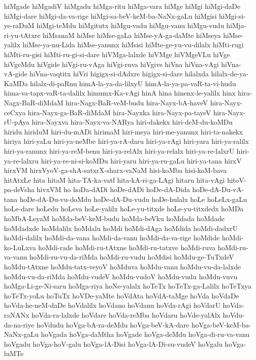 {hiMgade
hiMgadiV
hiMgadu
hiMga-ritu
hiMga-vara
hiMge
hiMgi
hiMgi-daDe
hiMgi-dare
hiMgi-da-va-rige
hiMgi-sa-beV-keM-ba-NaNx-gaLu
hiMgisi
hiMgi-si-ye-raDuM
hiMgi-teMdu
hiMgitutx
hiMgu-vadu
hiMgu-vanu
hiMgu-vudu
hiMja-ri-yu-tAtxre
hiMsanaM
hiMse
hiMse-gaLa
hiMse-yA-ga-daMte
hiMseya
hiMse-yalilx
hiMse-ya-nu-Lida
hiMse-yanunx
hiMsisi
hiMte-ge-yu-vu-dilalx
hiMti-rugi
hiMti-ru-gisi
hiMti-ru-gi-si-dare
hiVMga-lalxde
hiVMge
hiVMgeVLu
hiVge
hiVgeMdu
hiVgide
hiVgi-ru-vAga
hiVgi-ruva
hiVgive
hiVna
hiVna-vAgi
hiVna-vA-gide
hiVna-vaqtitx
hiVri
higigx-si-dAdxre
higigx-si-dare
hilalxda
hilalx-de-ya-KaMDa
hilalx-di-paRnu
himA-la-ya-da-lilxyU
himA-la-ya-pa-vaR-ta-vi-hudu
hima-va-tapx-vaR-ta-dalilx
himumx-Ka-vAgi
hinA
hina
hinenx-le-yalilx
hinx
hira-Nagx-BaR-diMdaM
hira-Nagx-BaR-veM-budu
hira-Nayx-bA-haveV
hira-Nayx-ceCxya
hira-Nayx-ga-BaR-diMdaM
hira-Nayxka
hira-Nayx-pa-tayeV
hira-Nayx-rU-pAya
hira-Nayxva
hira-Nayx-va-NARya
hiri-dakekx
hiri-deM-du-koMDu
hiridu
hiriduM
hiri-du-mADi
hirimaM
hiri-meya
hiri-me-yanunx
hiri-ta-nakekx
hiriya
hiri-yaLu
hiri-ya-neMbe
hiri-ya-rA-daru
hiri-ya-rAgi
hiri-yara
hiri-ya-ralilx
hiri-ya-ranunx
hiri-ya-reM-benu
hiri-ya-relAlx
hiri-ya-relalx
hiri-ya-re-lalxrU
hiri-ya-re-lalxru
hiri-ya-re-ni-si-koMDu
hiri-yaru
hiri-ya-ru-gaLu
hiri-ya-tana
hirxV
hirxVM
hirxVyoV-ga-shA-satxrX-sharx-vaNaM
hisi-koMba
hisi-koM-bava
hitAtxLe
hita
hitaM
hita-TA-ka-vatf
hita-kA-ri-ga-LAgi
hitaru
hita-vAgi
hitoV-pa-deVsha
hivxVM
ho
hoDa-dADi
hoDe-dADi
hoDe-dA-Dida
hoDe-dA-Du-vA-tana
hoDe-dA-Du-vu-doMdu
hoDe-dA-Du-vudu
hoDe-hulalx
hoLe
hoLeLx-gaLu
hoLe-dare
hoLedu
hoLeva
hoLe-yalilx
hoLe-yu-titxde
hoLe-yu-titxdedx
hoMDa
hoMbA-LeyaM
hoMda-beV-keM-budu
hoMda-beVku
hoMdada
hoMdade
hoMdadxde
hoMdalilx
hoMdalu
hoMdi
hoMdi-dAga
hoMdida
hoMdi-dadxrU
hoMdi-dalilx
hoMdi-da-vana
hoMdi-da-vanu
hoMdi-da-va-rige
hoMdide
hoMdi-ko-LuLxva
hoMdi-rade
hoMdi-ru-tAtxne
hoMdi-ru-tatxve
hoMdi-ruva
hoMdi-ru-va-vanu
hoMdi-ru-vu-da-riMda
hoMdi-ru-vudu
hoMdisi
hoMdu-ge-TuTxdeV
hoMdu-tAtxne
hoMdu-tatx-veyoV
hoMduva
hoMdu-vanu
hoMdu-vu-da-lalxde
hoMdu-vu-da-riMda
hoMdu-vudeV
hoMdu-vudoV
hoMdu-vudu
hoMdu-vuvu
hoMga-Li-ge-Ni-saru
hoMga-riya
hoNe-yalalx
hoTeTx
hoTeTx-ga-Lalilx
hoTeTxya
hoTeTx-yoLu
hoTuTx
hoVDe-yaMte
hoVdAta
hoVdA-taMge
hoVda
hoVdaDe
hoVda-he-neM-daDe
hoVdalilx
hoVdano
hoVdanu
hoVda-rAgi
hoVdarU
hoVda-raNANx
hoVda-ra-lalxde
hoVdare
hoVda-reMba
hoVdaru
hoVde-yalAlx
hoVdu-da-na-riye
hoVdudu
hoVga-bA-ra-deMdu
hoVga-beV-kA-dare
hoVga-beV-keM-ba-NaNx-gaLu
hoVgada
hoVga-daMtha
hoVgade
hoVga-deMdu
hoVga-di-ru-va-vanu
hoVgadu
hoVga-hoV-galu
hoVga-lA-Disi
hoVga-lA-Di-su-vudeV
hoVgalu
hoVga-luMTe
}
